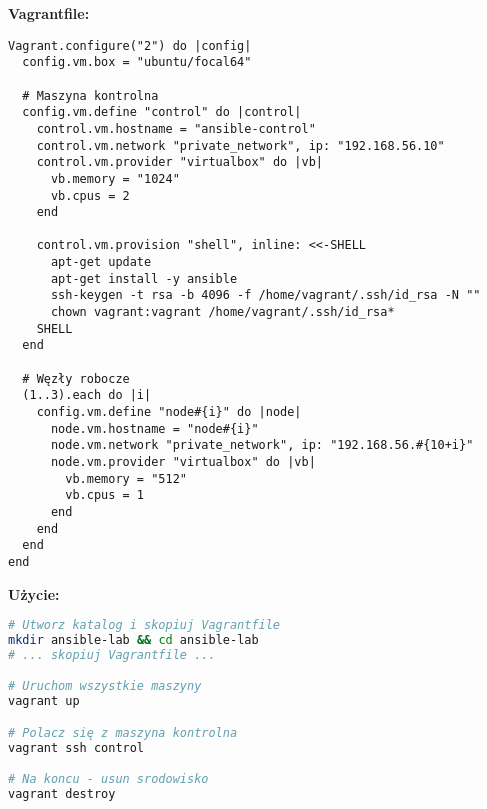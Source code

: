 \documentclass{article}
\begin{document}
\textbf{Vagrantfile:}
\begin{lstlisting}
Vagrant.configure("2") do |config|
  config.vm.box = "ubuntu/focal64"
  
  # Maszyna kontrolna
  config.vm.define "control" do |control|
    control.vm.hostname = "ansible-control"
    control.vm.network "private_network", ip: "192.168.56.10"
    control.vm.provider "virtualbox" do |vb|
      vb.memory = "1024"
      vb.cpus = 2
    end
    
    control.vm.provision "shell", inline: <<-SHELL
      apt-get update
      apt-get install -y ansible
      ssh-keygen -t rsa -b 4096 -f /home/vagrant/.ssh/id_rsa -N ""
      chown vagrant:vagrant /home/vagrant/.ssh/id_rsa*
    SHELL
  end
  
  # Węzły robocze
  (1..3).each do |i|
    config.vm.define "node#{i}" do |node|
      node.vm.hostname = "node#{i}"
      node.vm.network "private_network", ip: "192.168.56.#{10+i}"
      node.vm.provider "virtualbox" do |vb|
        vb.memory = "512"
        vb.cpus = 1
      end
    end
  end
end
\end{lstlisting}

\textbf{Użycie:}
\begin{lstlisting}[language=bash]
# Utworz katalog i skopiuj Vagrantfile
mkdir ansible-lab && cd ansible-lab
# ... skopiuj Vagrantfile ...

# Uruchom wszystkie maszyny
vagrant up

# Polacz się z maszyna kontrolna
vagrant ssh control

# Na koncu - usun srodowisko
vagrant destroy
\end{lstlisting}
\end{document}

